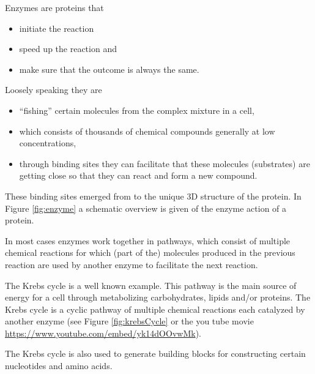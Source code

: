 \documentclass[
  11pt,
]{book}
\providecommand{\tightlist}{%
  \setlength{\itemsep}{0pt}\setlength{\parskip}{0pt}}
\begin{document}
Enzymes are proteins that

\begin{itemize}
\tightlist
\item
  initiate the reaction
\item
  speed up the reaction and
\item
  make sure that the outcome is always the same.
\end{itemize}

Loosely speaking they are

\begin{itemize}
\tightlist
\item
  ``fishing'' certain molecules from the complex mixture in a cell,
\item
  which consists of thousands of chemical compounds generally at low concentrations,
\item
  through binding sites they can facilitate that these molecules (substrates) are getting close so that they can react and form a new compound.
\end{itemize}

These binding sites emerged from to the unique 3D structure of the protein. In Figure \ref{fig:enzyme} a schematic overview is given of the enzyme action of a protein.

In most cases enzymes work together in pathways, which consist of multiple chemical reactions for which (part of the) molecules produced in the previous reaction are used by another enzyme to facilitate the next reaction.

The Krebs cycle is a well known example. This pathway is the main source of energy for a cell through metabolizing carbohydrates, lipids and/or proteins. The Krebs cycle is a cyclic pathway of multiple chemical reactions each catalyzed by another enzyme (see Figure \ref{fig:krebsCycle} or the you tube movie \url{https://www.youtube.com/embed/yk14dOOvwMk}).

The Krebs cycle is also used to generate building blocks for constructing certain nucleotides and amino acids.
\end{document}

